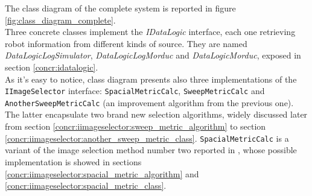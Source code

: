 The class diagram of the complete system is reported in figure
\ref{fig:class_diagram_complete}. 
\\
Three concrete classes implement the \textit{IDataLogic} interface,
each one retrieving robot information from different kinds of source.
They are named \textit{DataLogicLogSimulator}, \textit{DataLogicLogMorduc}
and \textit{DataLogicMorduc}, exposed in section \ref{concr:idatalogic}.
\\
As it's easy to notice, class diagram presents also three implementations 
of the \texttt{IImageSelector} interface: \texttt{SpacialMetricCalc},
\texttt{SweepMetricCalc} and \texttt{AnotherSweepMetricCalc}
(an improvement algorithm from the previous one).
The latter encapsulate two brand new selection algorithms,
widely discussed later from section
\ref{concr:iimageselector:sweep_metric_algorithm} to section
\ref{concr:iimageselector:another_sweep_metric_class}.
\texttt{SpacialMetricCalc} is a variant 
of the image selection method number two reported in \cite{sugimoto}, 
whose possible implementation is showed in sections
\ref{concr:iimageselector:spacial_metric_algorithm} and
\ref{concr:iimageselector:spacial_metric_class}.
